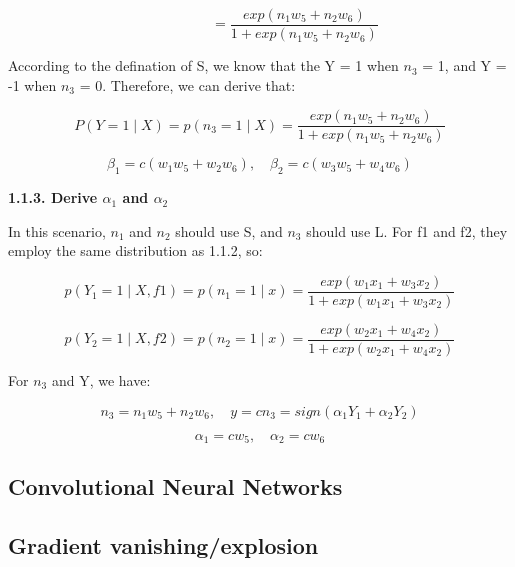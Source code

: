 \documentclass{article} %
\begin{document}
\begin{equation}
\qquad \qquad \quad = \frac{exp(n_1 w_5 + n_2 w_6)}{1 + exp(n_1 w_5 + n_2 w_6)}
\end{equation}

According to the defination of S, we know that the Y = 1 when $n_3$ = 1, and Y = -1
when $n_3$ = 0. Therefore, we can derive that:

\begin{equation}
P(Y=1 \mid X) = p(n_3 = 1 \mid X) = \frac{exp(n_1 w_5 + n_2 w_6)}
{1 + exp(n_1 w_5 + n_2 w_6)}
\end{equation}

\begin{equation}
\beta_1 = c (w_1 w_5 + w_2 w_6),  \quad
\beta_2 = c (w_3 w_5 + w_4 w_6)
\end{equation}

\textbf{1.1.3. Derive $\alpha_1$ and $\alpha_2$}

In this scenario, $n_1$ and $n_2$ should use S, and $n_3$ should use L. For f1
and f2, they employ the same distribution as 1.1.2, so:

\begin{equation}
p(Y_1=1 \mid X, f1) = p (n_1=1 \mid x)
= \frac{exp(w_1 x_1 + w_3 x_2)}{1 + exp(w_1 x_1 + w_3 x_2)}
\end{equation}

\begin{equation}
p(Y_2=1 \mid X, f2) = p (n_2=1 \mid x)
= \frac{exp(w_2 x_1 + w_4 x_2)}{1 + exp(w_2 x_1 + w_4 x_2)}
\end{equation}

For $n_3$ and Y, we have:

\begin{equation}
n_3 = n_1 w_5 + n_2 w_6, \quad
y = c n_3 = sign(\alpha_1 Y_1 + \alpha_2 Y_2)
\end{equation}

\begin{equation}
\alpha_1 = c w_5, \quad
\alpha_2 = c w_6
\end{equation}


\subsection{Convolutional Neural Networks}


\subsection{Gradient vanishing/explosion}
\end{document}
